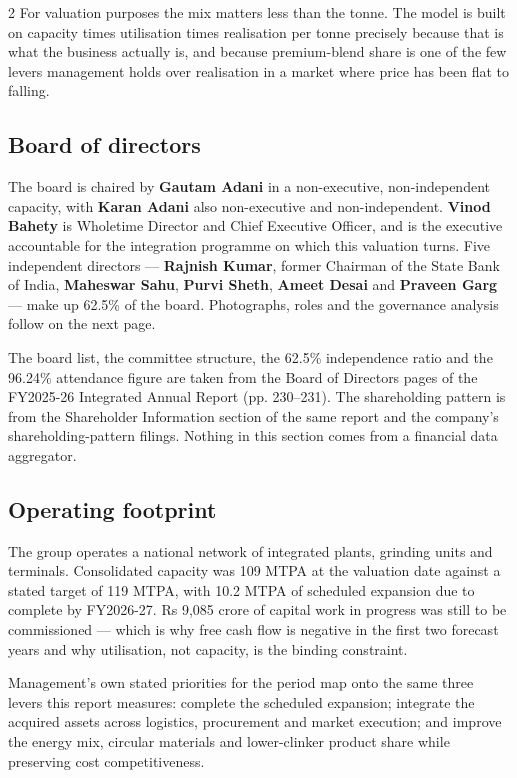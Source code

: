 \begin{paracol}{2}
For valuation purposes the mix matters less than the tonne. The model is built on
capacity times utilisation times realisation per tonne precisely because that is what
the business actually is, and because premium-blend share is one of the few levers
management holds over realisation in a market where price has been flat to falling.

\subsection{Board of directors}

The board is chaired by \textbf{Gautam Adani} in a non-executive, non-independent
capacity, with \textbf{Karan Adani} also non-executive and non-independent.
\textbf{Vinod Bahety} is Wholetime Director and Chief Executive Officer, and is the
executive accountable for the integration programme on which this valuation turns.
Five independent directors — \textbf{Rajnish Kumar}, former Chairman of the State Bank
of India, \textbf{Maheswar Sahu}, \textbf{Purvi Sheth}, \textbf{Ameet Desai} and
\textbf{Praveen Garg} — make up 62.5\% of the board. Photographs, roles and the
governance analysis follow on the next page.

\begin{okbox}
The board list, the committee structure, the 62.5\% independence ratio and the 96.24\%
attendance figure are taken from the Board of Directors pages of the FY2025-26
Integrated Annual Report (pp. 230--231). The shareholding pattern is from the
Shareholder Information section of the same report and the company's
shareholding-pattern filings. Nothing in this section comes from a financial data
aggregator.
\end{okbox}

\subsection{Operating footprint}

The group operates a national network of integrated plants, grinding units and
terminals. Consolidated capacity was 109 MTPA at the valuation date against a stated
target of 119 MTPA, with 10.2 MTPA of scheduled expansion due to complete by
FY2026-27. Rs 9,085 crore of capital work in progress was still to be commissioned —
which is why free cash flow is negative in the first two forecast years and why
utilisation, not capacity, is the binding constraint.

Management's own stated priorities for the period map onto the same three levers this
report measures: complete the scheduled expansion; integrate the acquired assets
across logistics, procurement and market execution; and improve the energy mix,
circular materials and lower-clinker product share while preserving cost
competitiveness.


\end{paracol}

